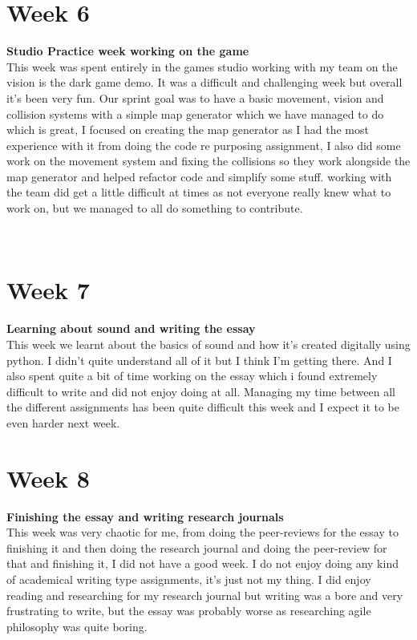 \documentclass[11pt]{article}
\begin{document}
{\section*{Week 6}
{\small \textbf{Studio Practice week working on the game}}\\
This week was spent entirely in the games studio working with my team on the vision is the dark game demo. It was a difficult and challenging week but overall it's been very fun. Our sprint goal was to have a basic movement, vision and collision systems with a simple map generator which we have managed to do which is great, I focused on creating the map generator as I had the most experience with it from doing the code re purposing assignment, I also did some work on the movement system and fixing the collisions so they work alongside the map generator and helped refactor code and simplify some stuff. working with the team did get a little difficult at times as not everyone really knew what to work on, but we managed to all do something to contribute.
}
\\
{\section*{Week 7}
{\small \textbf{Learning about sound and writing the essay}}\\
This week we learnt about the basics of sound and how it's created digitally using python. I didn't quite understand all of it but I think I'm getting there. And I also spent quite a bit of time working on the essay which i found extremely difficult to write and did not enjoy doing at all. Managing my time between all the different assignments has been quite difficult this week and I expect it to be even harder next week.
}

{\section*{Week 8}
{\small \textbf{Finishing the essay and writing research journals}}\\
This week was very chaotic for me, from doing the peer-reviews for the essay to finishing it and then doing the research journal and doing the peer-review for that and finishing it, I did not have a good week. I do not enjoy doing any kind of academical writing type assignments, it's just not my thing. I did enjoy reading and researching for my research journal but writing was a bore and very frustrating to write, but the essay was probably worse as researching agile philosophy was quite boring.
}
\end{document}
